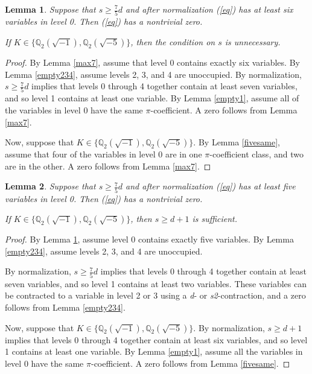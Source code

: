 \documentclass[12pt]{amsart}
\newtheorem{lemma}{Lemma}
\begin{document}
\begin{lemma} \label{max6}
Suppose that $s \ge \frac{7}{5}d$ and after normalization (\ref{eq}) has at least six variables in level 0.  Then (\ref{eq}) has a nontrivial zero.  

If $K \in \{\mathbb{Q}_2(\sqrt{-1}), \mathbb{Q}_2(\sqrt{-5})\}$, then the condition on $s$ is unnecessary.
\end{lemma}
\begin{proof}
By Lemma \ref{max7}, assume that level 0 contains exactly six variables.  By Lemma \ref{empty234}, assume levels 2, 3, and 4 are unoccupied.  By normalization, $s \ge \frac{7}{5}d$ implies that levels 0 through 4 together contain at least seven variables, and so level 1 contains at least one variable.  By Lemma \ref{empty1}, assume all of the variables in level 0 have the same $\pi$-coefficient.  A zero follows from Lemma \ref{max7}.

Now, suppose that $K \in \{\mathbb{Q}_2(\sqrt{-1}), \mathbb{Q}_2(\sqrt{-5})\}$.  By Lemma \ref{fivesame}, assume that four of the variables in level 0 are in one $\pi$-coefficient class, and two are in the other.  A zero follows from Lemma \ref{max7}.
\end{proof}

\begin{lemma} \label{max5}
Suppose that $s \ge \frac{7}{5}d$ and after normalization (\ref{eq}) has at least five variables in level 0.  Then (\ref{eq}) has a nontrivial zero.  

If $K \in \{\mathbb{Q}_2(\sqrt{-1}), \mathbb{Q}_2(\sqrt{-5})\}$, then $s \ge d + 1$ is sufficient.
\end{lemma}
\begin{proof}
By Lemma \ref{max6}, assume level 0 contains exactly five variables.  By Lemma \ref{empty234}, assume levels 2, 3, and 4 are unoccupied.

By normalization, $s \ge \frac{7}{5}d$ implies that levels 0 through 4 together contain at least seven variables, and so level 1 contains at least two variables.  These variables can be contracted to a variable in level 2 or 3 using a \textit{d}- or \textit{s2}-contraction, and a zero follows from Lemma \ref{empty234}.

Now, suppose that $K \in \{\mathbb{Q}_2(\sqrt{-1}), \mathbb{Q}_2(\sqrt{-5})\}$.  By normalization, $s \ge d + 1$ implies that levels 0 through 4 together contain at least six variables, and so level 1 contains at least one variable. By Lemma \ref{empty1}, assume all the variables in level 0 have the same $\pi$-coefficient.  A zero follows from Lemma \ref{fivesame}.
\end{proof}
\end{document}
